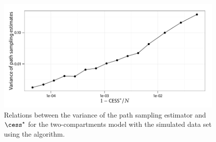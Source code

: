 \begin{figure}[t]
  \UseAltLinespread
  \includegraphics[width=\linewidth]{fig_src/CESS_Path_Var}
  \caption[Relations between the variance of the path sampling estimator and
  \protect\cess]
  {Relations between the variance of the path sampling estimator and
    $\cess^\star$ for the two-compartments \pet model with the simulated data
  set using the \smc[2] algorithm.}
  \label{fig:cess path var}
\end{figure}
